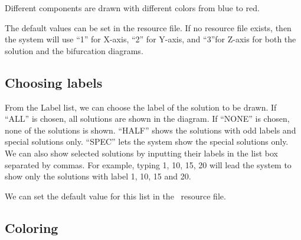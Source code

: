 Different components are drawn with different colors from blue to red. 

The default values can be set in the resource file. If no resource file exists, then the system
will use ``1'' for X-axis, ``2'' for Y-axis, and ``3''for Z-axis for both the solution and the bifurcation
diagrams.

\subsection{Choosing labels}

From the Label list, we can choose the label of the solution to be drawn. If ``ALL'' is chosen, all 
solutions are shown in the diagram. If ``NONE'' is chosen, none of the solutions is shown.
``HALF'' shows the solutions with odd labels and special solutions only. ``SPEC'' lets the system
show the special solutions only.
We can also show selected solutions by inputting their labels in the list
box separated by commas. 
For example, typing 1, 10, 15, 20 will lead the system to show only the solutions with label 1, 10, 15 and 20. 

We can set the default value for this list in the \PLAUT~resource file.

\subsection{Coloring}

